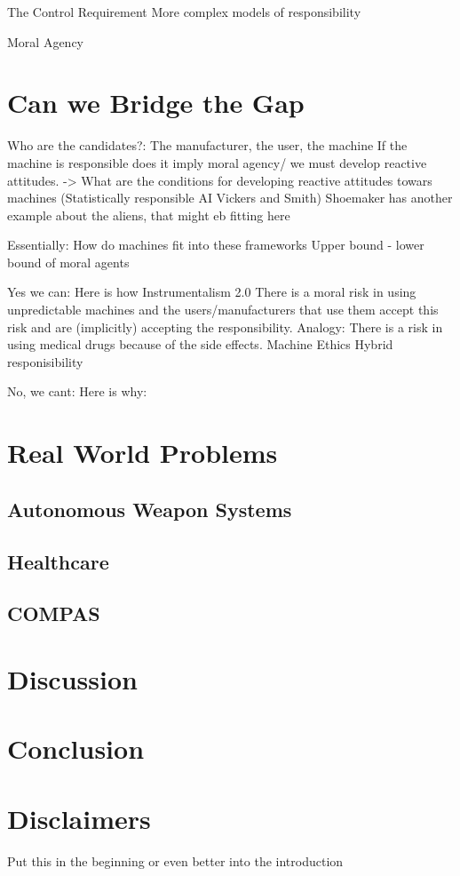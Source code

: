 \documentclass{article}
\newcounter{example}[section]
\begin{document}
The Control Requirement
More complex models of responsibility

Moral Agency
\section{Can we Bridge the Gap}

Who are the candidates?: The manufacturer, the user, the machine
If the machine is responsible does it imply moral agency/ we must develop
reactive attitudes. -> What are the conditions for developing reactive attitudes
towars machines (Statistically responsible AI Vickers and Smith)
Shoemaker has another example about the aliens, that might eb fitting here

Essentially: How do machines fit into these frameworks
Upper bound - lower bound of moral agents

Yes we can: Here is how
Instrumentalism 2.0
	There is a moral risk in using unpredictable machines and the
	users/manufacturers that use them accept this risk and are (implicitly)
	accepting the responsibility. Analogy: There is a risk in using medical
	drugs because of the side effects.
Machine Ethics
Hybrid responisibility

No, we cant: Here is why:

\section{Real World Problems}
\subsection{Autonomous Weapon Systems}
\subsection{Healthcare}
\subsection{COMPAS}
\section{Discussion}
\section{Conclusion}
\section{Disclaimers}
Put this in the beginning or even better into the introduction
\end{document}
